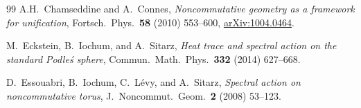 \documentclass[11pt,a4paper]{article}
\begin{document}
\begin{thebibliography}{99}
A.H.~Chamseddine and A.~Connes,
\textit{Noncommutative geometry as a framework for unification},
Fortsch.\ Phys.\ \textbf{58} (2010) 553--600,
\href{https://arxiv.org/abs/1004.0464}{arXiv:1004.0464}.

M.~Eckstein, B.~Iochum, and A.~Sitarz,
\textit{Heat trace and spectral action on the standard Podle\'{s} sphere},
Commun.\ Math.\ Phys.\ \textbf{332} (2014) 627--668.

D.~Essouabri, B.~Iochum, C.~L\'{e}vy, and A.~Sitarz,
\textit{Spectral action on noncommutative torus},
J.\ Noncommut.\ Geom.\ \textbf{2} (2008) 53--123.

\end{thebibliography}
\end{document}
